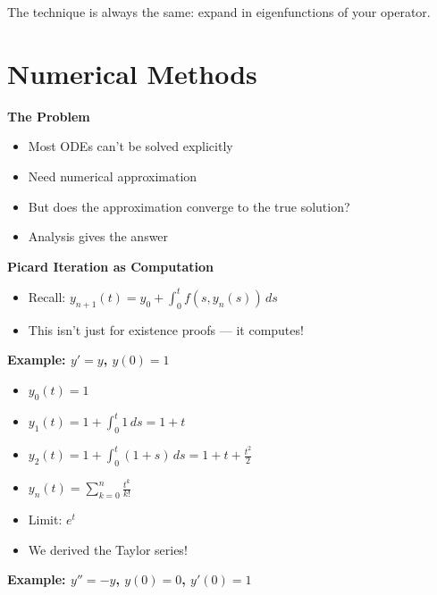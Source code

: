 \documentclass[
  10pt,
  letterpaper,
]{scrbook}
\providecommand{\tightlist}{%
  \setlength{\itemsep}{0pt}\setlength{\parskip}{0pt}}
\begin{document}
The technique is always the same: expand in eigenfunctions of your
operator.

\section{Numerical Methods}\label{numerical-methods}

\textbf{The Problem}

\begin{itemize}
\tightlist
\item
  Most ODEs can't be solved explicitly
\item
  Need numerical approximation
\item
  But does the approximation converge to the true solution?
\item
  Analysis gives the answer
\end{itemize}

\textbf{Picard Iteration as Computation}

\begin{itemize}
\tightlist
\item
  Recall: \(y_{n+1}(t) = y_0 + \int_0^t f(s, y_n(s))\, ds\)
\item
  This isn't just for existence proofs --- it computes!
\end{itemize}

\textbf{Example: \(y' = y\), \(y(0) = 1\)}

\begin{itemize}
\tightlist
\item
  \(y_0(t) = 1\)
\item
  \(y_1(t) = 1 + \int_0^t 1\, ds = 1 + t\)
\item
  \(y_2(t) = 1 + \int_0^t (1 + s)\, ds = 1 + t + \frac{t^2}{2}\)
\item
  \(y_n(t) = \sum_{k=0}^n \frac{t^k}{k!}\)
\item
  Limit: \(e^t\)
\item
  We derived the Taylor series!
\end{itemize}

\textbf{Example: \(y'' = -y\), \(y(0) = 0\), \(y'(0) = 1\)}
\end{document}

